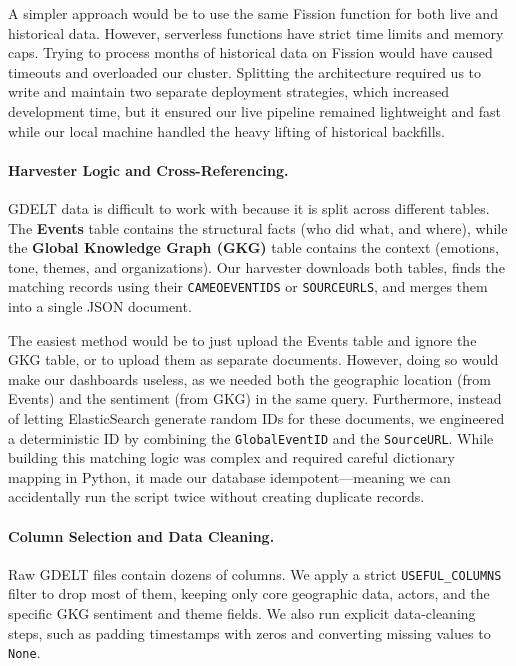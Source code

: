 A simpler approach would be to use the same Fission function for both live and historical data. However, serverless functions have strict time limits and memory caps. Trying to process months of historical data on Fission would have caused timeouts and overloaded our cluster. Splitting the architecture required us to write and maintain two separate deployment strategies, which increased development time, but it ensured our live pipeline remained lightweight and fast while our local machine handled the heavy lifting of historical backfills.

\paragraph{Harvester Logic and Cross-Referencing.}
GDELT data is difficult to work with because it is split across different tables. The \textbf{Events} table contains the structural facts (who did what, and where), while the \textbf{Global Knowledge Graph (GKG)} table contains the context (emotions, tone, themes, and organizations). Our harvester downloads both tables, finds the matching records using their \texttt{CAMEOEVENTIDS} or \texttt{SOURCEURLS}, and merges them into a single JSON document. 

The easiest method would be to just upload the Events table and ignore the GKG table, or to upload them as separate documents. However, doing so would make our dashboards useless, as we needed both the geographic location (from Events) and the sentiment (from GKG) in the same query. Furthermore, instead of letting ElasticSearch generate random IDs for these documents, we engineered a deterministic ID by combining the \texttt{GlobalEventID} and the \texttt{SourceURL}. While building this matching logic was complex and required careful dictionary mapping in Python, it made our database idempotent—meaning we can accidentally run the script twice without creating duplicate records.

\paragraph{Column Selection and Data Cleaning.}
Raw GDELT files contain dozens of columns. We apply a strict \texttt{USEFUL\_COLUMNS} filter to drop most of them, keeping only core geographic data, actors, and the specific GKG sentiment and theme fields. We also run explicit data-cleaning steps, such as padding timestamps with zeros and converting missing values to \texttt{None}.

